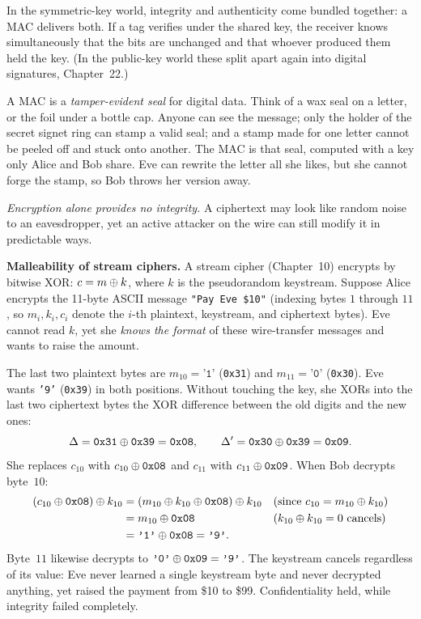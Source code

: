 In the symmetric-key world, integrity and authenticity come bundled together: a MAC delivers both. If a tag verifies under the shared key, the receiver knows simultaneously that the bits are unchanged and that whoever produced them held the key. (In the public-key world these split apart again into digital signatures, Chapter~22.)

\begin{intuitionbox}
A MAC is a \emph{tamper-evident seal} for digital data. Think of a wax seal on a letter, or the foil under a bottle cap. Anyone can see the message; only the holder of the secret signet ring can stamp a valid seal; and a stamp made for one letter cannot be peeled off and stuck onto another. The MAC is that seal, computed with a key only Alice and Bob share. Eve can rewrite the letter all she likes, but she cannot forge the stamp, so Bob throws her version away.
\end{intuitionbox}

\emph{Encryption alone provides no integrity.} A ciphertext may look like random noise to an eavesdropper, yet an active attacker on the wire can still modify it in predictable ways.

\begin{attackbox}
\textbf{Malleability of stream ciphers.} A stream cipher (Chapter~10) encrypts by bitwise XOR: $c = m \oplus k$, where $k$ is the pseudorandom keystream. Suppose Alice encrypts the 11-byte ASCII message \texttt{"Pay Eve \$10"} (indexing bytes $1$ through $11$, so $m_i, k_i, c_i$ denote the $i$-th plaintext, keystream, and ciphertext bytes). Eve cannot read $k$, yet she \emph{knows the format} of these wire-transfer messages and wants to raise the amount.

The last two plaintext bytes are $m_{10} = \texttt{'1'}$ (\texttt{0x31}) and $m_{11} = \texttt{'0'}$ (\texttt{0x30}). Eve wants \texttt{'9'} (\texttt{0x39}) in both positions. Without touching the key, she XORs into the last two ciphertext bytes the XOR difference between the old digits and the new ones:
\[
  \Delta = \texttt{0x31} \oplus \texttt{0x39} = \texttt{0x08}, \qquad
  \Delta' = \texttt{0x30} \oplus \texttt{0x39} = \texttt{0x09}.
\]
She replaces $c_{10}$ with $c_{10} \oplus \texttt{0x08}$ and $c_{11}$ with $c_{11} \oplus \texttt{0x09}$. When Bob decrypts byte~$10$:
\begin{align*}
  (c_{10} \oplus \texttt{0x08}) \oplus k_{10}
    &= (m_{10} \oplus k_{10} \oplus \texttt{0x08}) \oplus k_{10} && \text{(since $c_{10} = m_{10} \oplus k_{10}$)} \\
    &= m_{10} \oplus \texttt{0x08} && \text{($k_{10} \oplus k_{10} = 0$ cancels)} \\
    &= \texttt{'1'} \oplus \texttt{0x08} = \texttt{'9'}.
\end{align*}
Byte~$11$ likewise decrypts to $\texttt{'0'} \oplus \texttt{0x09} = \texttt{'9'}$. The keystream cancels regardless of its value: Eve never learned a single keystream byte and never decrypted anything, yet raised the payment from \$10 to \$99. Confidentiality held, while integrity failed completely.
\end{attackbox}

